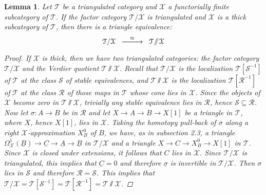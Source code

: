 \documentclass[oneside, a4paper,reqno]{amsart}
\numberwithin{equation}{section}
\newtheorem{lem}[thm]{Lemma}
\theoremstyle{definition}
\begin{document}
\begin{lem} Let ${\mathcal T}$ be a triangulated category and ${\mathcal X}$ a functorially finite subcategory of ${\mathcal T}$.   If the factor category ${\mathcal T}/{\mathcal X}$ is triangulated and ${\mathcal X}$ is a thick subcategory of ${\mathcal T}$, then there is a triangle equivalence: 
\[
\begin{CD}
{\mathcal T}/{\mathcal X}  \,\, @> \approx >> \,\, {\mathcal T}\!\sslash \! {\mathcal X}
\end{CD}
\]
\begin{proof} If ${\mathcal X}$ is thick, then we have two triangulated categories: the factor category ${\mathcal T}/{\mathcal X}$ and the Verdier quotient ${\mathcal T}\!\sslash \! {\mathcal X}$. Recall that ${\mathcal T}/{\mathcal X}$  is the localization ${\mathcal T}[\mathcal S^{-1}]$ of ${\mathcal T}$ at the class  $\mathcal S$ of stable equivalences, and ${\mathcal T}\!\sslash\!{\mathcal X}$ is the localization ${\mathcal T}[\mathcal R^{-1}]$ of ${\mathcal T}$ at the class $\mathcal R$ of those maps  in ${\mathcal T}$ whose cone lies in ${\mathcal X}$. Since the objects of ${\mathcal X}$ become zero in ${\mathcal T}\!\sslash\!{\mathcal X}$, trivially any stable equivalence lies in $\mathcal R$, hence $\mathcal S \subseteq \mathcal R$. Now let $\sigma \colon A {\longrightarrow} B$ be in ${\mathcal R}$ and let $X {\longrightarrow} A {\longrightarrow} B {\longrightarrow} X[1]$ be a triangle in ${\mathcal T}$, where $X$, hence $X[1]$, lies in ${\mathcal X}$. Taking the homotopy pull-back of $\sigma$ along a right ${\mathcal X}$-approximation $X^{0}_{B}$ of $B$, we have, as in subsection 2.3, a triangle $\Omega^{1}_{\mathcal X}({\underline B}) {\longrightarrow} {\underline C} {\longrightarrow} \underline{A} {\longrightarrow} {\underline B}$ in ${\mathcal T}/{\mathcal X}$ and a triangle $X {\longrightarrow} C {\longrightarrow} X^{0}_{B} {\longrightarrow} X[1]$ in ${\mathcal T}$. Since ${\mathcal X}$ is closed under extensions, it follows that $C$ lies in ${\mathcal X}$. Since ${\mathcal T}/{\mathcal X}$ is triangulated, this implies that ${\underline C} = 0$ and therefore $\underline{\sigma}$ is invertible in ${\mathcal T}/{\mathcal X}$. Then $\sigma$ lies in $\mathcal S$ and therefore ${\mathcal R} = \mathcal S$. 
This implies that ${\mathcal T}/{\mathcal X} = {\mathcal T}[\mathcal S^{-1}] = {\mathcal T}[\mathcal R^{-1}] = {\mathcal T}\!\sslash {\mathcal X}$. 
\end{proof}
\end{lem} 
\end{document}
